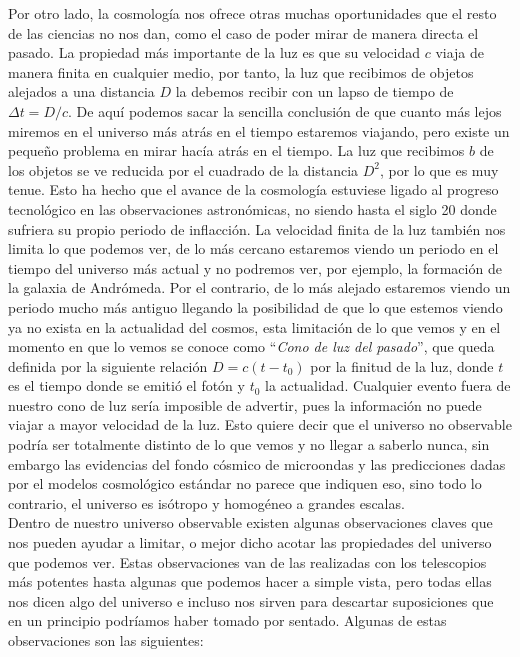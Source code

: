 Por otro lado, la cosmología nos ofrece otras muchas oportunidades que el resto de las ciencias no nos dan, como el caso de poder mirar de manera directa el pasado. La propiedad más importante de la luz es que su velocidad $c$ viaja de manera finita en cualquier medio, por tanto, la luz que recibimos de objetos alejados a una distancia $D$ la debemos recibir con un lapso de tiempo de $\Delta t=D/c$. De aquí podemos sacar la sencilla conclusión de que cuanto más lejos miremos en el universo más atrás en el tiempo estaremos viajando, pero existe un pequeño problema en mirar hacía atrás en el tiempo. La luz que recibimos $b$ de los objetos se ve reducida por el cuadrado de la distancia $D^2$, por lo que es muy tenue. Esto ha hecho que el avance de la cosmología estuviese ligado al progreso tecnológico en las observaciones astronómicas, no siendo hasta el siglo 20 donde sufriera su propio periodo de inflacción. La velocidad finita de la luz también nos limita lo que podemos ver, de lo más cercano estaremos viendo un periodo en el tiempo del universo más actual y no podremos ver, por ejemplo, la formación de la galaxia de Andrómeda. Por el contrario, de lo más alejado estaremos viendo un periodo mucho más antiguo llegando la posibilidad de que lo que estemos viendo ya no exista en la actualidad del cosmos, esta limitación de lo que vemos y en el momento en que lo vemos se conoce como ``\textit{Cono de luz del pasado}'', que queda definida por la siguiente relación $D=c(t-t_0)$ por la finitud de la luz, donde $t$ es el tiempo donde se emitió el fotón y $t_0$ la actualidad. Cualquier evento fuera de nuestro cono de luz sería imposible de advertir, pues la información no puede viajar a mayor velocidad de la luz. Esto quiere decir que el universo no observable podría ser totalmente distinto de lo que vemos y no llegar a saberlo nunca, sin embargo las evidencias del fondo cósmico de microondas y las predicciones dadas por el modelos cosmológico estándar no parece que indiquen eso, sino todo lo contrario, el universo es isótropo y homogéneo a grandes escalas.\\

Dentro de nuestro universo observable existen algunas observaciones claves que nos pueden ayudar a limitar, o mejor dicho acotar las propiedades del universo que podemos ver. Estas observaciones van de las realizadas con los telescopios más potentes hasta algunas que podemos hacer a simple vista, pero todas ellas nos dicen algo del universo e incluso nos sirven para descartar suposiciones que en un principio podríamos haber tomado por sentado. Algunas de estas observaciones son las siguientes:

